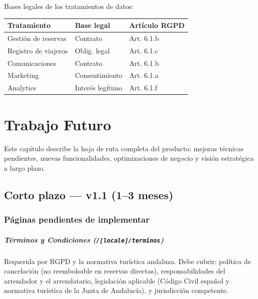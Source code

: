 \documentclass[12pt,a4paper,twoside,openright]{report}
\begin{document}
Bases legales de los tratamientos de datos:

\begin{longtable}{L{5cm} L{4cm} L{3.5cm}}
  \toprule
  \textbf{Tratamiento} & \textbf{Base legal} & \textbf{Artículo RGPD} \\
  \midrule
  Gestión de reservas & Contrato & Art. 6.1.b \\
  Registro de viajeros & Oblig. legal & Art. 6.1.c \\
  Comunicaciones & Contrato & Art. 6.1.b \\
  Marketing & Consentimiento & Art. 6.1.a \\
  Analytics & Interés legítimo & Art. 6.1.f \\
  \bottomrule
\end{longtable}

\chapter{Trabajo Futuro}

Este capítulo describe la hoja de ruta completa del producto: mejoras técnicas
pendientes, nuevas funcionalidades, optimizaciones de negocio y visión estratégica
a largo plazo.

\section{Corto plazo — v1.1 (1–3 meses)}

\subsection{Páginas pendientes de implementar}

\paragraph{Términos y Condiciones (\texttt{/[locale]/terminos})}
Requerida por RGPD y la normativa turística andaluza. Debe cubrir: política de
cancelación (no reembolsable en reservas directas), responsabilidades del arrendador
y el arrendatario, legislación aplicable (Código Civil español y normativa turística
de la Junta de Andalucía), y jurisdicción competente.
\end{document}
